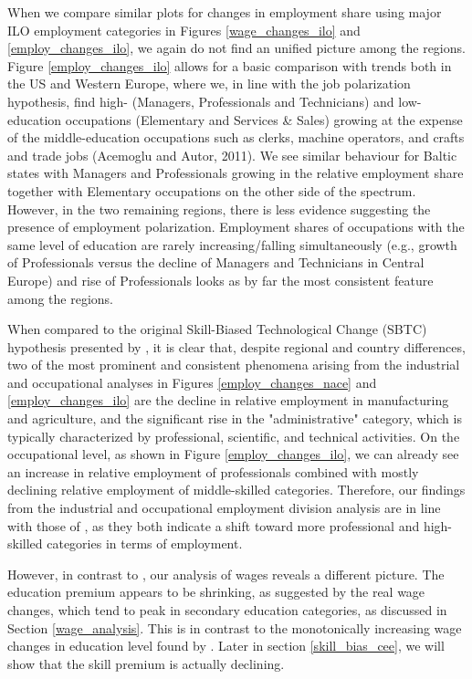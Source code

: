 \documentclass[11pt]{article}
\begin{document}
When we compare similar plots for changes in employment share using major ILO employment categories in Figures \ref{wage_changes_ilo} and \ref{employ_changes_ilo}, we again do not find an unified picture among the regions. Figure \ref{employ_changes_ilo} allows for a basic comparison with trends both in the US and Western Europe, where we, in line with the job polarization hypothesis, find high- (Managers, Professionals and Technicians) and low-education occupations (Elementary and Services \& Sales) growing at the expense of the middle-education occupations such as clerks, machine operators, and crafts and trade jobs (Acemoglu and Autor, 2011). We see similar behaviour for Baltic states with Managers and Professionals growing in the relative employment share together with Elementary occupations on the other side of the spectrum. However, in the two remaining regions, there is less evidence suggesting the presence of employment polarization. Employment shares of occupations with the same level of education are rarely increasing/falling simultaneously (e.g., growth of Professionals versus the decline of Managers and Technicians in Central Europe) and rise of Professionals looks as by far the most consistent feature among the regions.




When compared to the original Skill-Biased Technological Change (SBTC) hypothesis presented by \cite{katz1992changes}, it is clear that, despite regional and country differences, two of the most prominent and consistent phenomena arising from the industrial and occupational analyses in Figures \ref{employ_changes_nace} and \ref{employ_changes_ilo} are the decline in relative employment in manufacturing and agriculture, and the significant rise in the "administrative" category, which is typically characterized by professional, scientific, and technical activities. On the occupational level, as shown in Figure \ref{employ_changes_ilo}, we can already see an increase in relative employment of professionals combined with mostly declining relative employment of middle-skilled categories. Therefore, our findings from the industrial and occupational employment division analysis are in line with those of \cite{katz1992changes}, as they both indicate a shift toward more professional and high-skilled categories in terms of employment.

However, in contrast to \citeauthor{katz1992changes}, our analysis of wages reveals a different picture. The education premium appears to be shrinking, as suggested by the real wage changes, which tend to peak in secondary education categories, as discussed in Section \ref{wage_analysis}. This is in contrast to the monotonically increasing wage changes in education level found by \citeauthor{katz1992changes}. Later in section \ref{skill_bias_cee}, we will show that the skill premium is actually declining.
\end{document}
